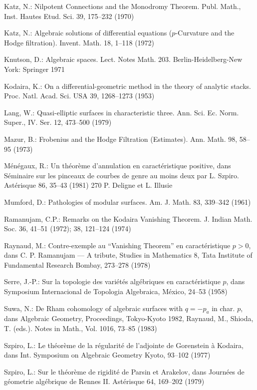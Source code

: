 \documentclass[10pt,reqno]{article}
\theoremstyle{plain}
\theoremstyle{definition}
\begin{document}
\begin{thebibliography}{28}
Katz, N.: Nilpotent Connections and the Monodromy Theorem. Publ. Math., Inst. Hautes Etud. Sci. 39, 175--232 (1970)

Katz, N.: Algebraic solutions of differential equations ($p$-Curvature and the Hodge filtration). Invent. Math. 18, 1--118 (1972)

Knutson, D.: Algebraic spaces. Lect. Notes Math. 203. Berlin-Heidelberg-New York: Springer 1971

Kodaira, K.: On a differential-geometric method in the theory of analytic stacks. Proc. Natl. Acad. Sci. USA 39, 1268--1273 (1953)

Lang, W.: Quasi-elliptic surfaces in characteristic three. Ann. Sci. Ec. Norm. Super., IV. Ser. 12, 473--500 (1979)

Mazur, B.: Frobenius and the Hodge Filtration (Estimates). Ann. Math. 98, 58--95 (1973)

M{\'e}n{\'e}gaux, R.: Un th{\'e}or{\`e}me d'annulation en caract{\'e}ristique positive, dans S{\'e}minaire sur les pinceaux de courbes de
genre au moins deux par L. Szpiro. Ast{\'e}risque 86, 35--43 (1981) 270 P. Deligne et L. Illusie

Mumford, D.: Pathologies of modular surfaces. Am. J. Math. 83, 339--342 (1961)

Ramanujam, C.P.: Remarks on the Kodaira Vanishing Theorem. J. Indian Math. Soc. 36, 41--51
(1972); 38, 121--124 (1974)

Raynaud, M.: Contre-exemple au ``Vanishing Theorem'' en caract{\'e}ristique $p>0$, dans C. P.
Ramanujam --- A tribute, Studies in Mathematics 8, Tata Institute of Fundamental Research
Bombay, 273--278 (1978)

Serre, J.-P.: Sur la topologie des vari{\'e}t{\'e}s alg{\'e}briques en caract{\'e}ristique $p$, dans Symposium
Internacional de Topologia Algebraica, M{\'e}xico, 24--53 (1958)

Suwa, N.: De Rham cohomology of algebraic surfaces with $q=-p_a$ in char. $p$, dans Algebraic
Geometry, Proceedings, Tokyo-Kyoto 1982, Raynaud, M., Shioda, T. (eds.). Notes in Math.,
Vol. 1016, 73--85 (1983)

Szpiro, L.: Le th{\'e}or{\`e}me de la r{\'e}gularit{\'e} de l'adjointe de Gorenstein {\`a} Kodaira, dans Int. Symposium
on Algebraic Geometry Kyoto, 93--102 (1977)

Szpiro, L.: Sur le th{\'e}or{\`e}me de rigidit{\'e} de Parsin et Arakelov, dans Journ{\'e}es de g{\'e}ometrie alg{\'e}brique
de Rennes II. Ast{\'e}risque 64, 169--202 (1979) 
\end{thebibliography}
\end{document}
